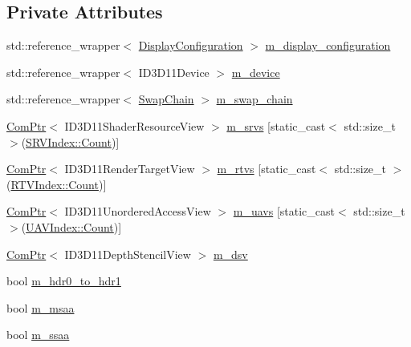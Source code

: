 \subsection*{Private Attributes}
\begin{DoxyCompactItemize}
\item 
std\+::reference\+\_\+wrapper$<$ \mbox{\hyperlink{classmage_1_1rendering_1_1_display_configuration}{Display\+Configuration}} $>$ \mbox{\hyperlink{classmage_1_1rendering_1_1_output_manager_a41905bc9eb0426c2e75d33d60bb95fbf}{m\+\_\+display\+\_\+configuration}}
\item 
std\+::reference\+\_\+wrapper$<$ I\+D3\+D11\+Device $>$ \mbox{\hyperlink{classmage_1_1rendering_1_1_output_manager_ad0f8b4613dfbd613576a3c58c8ff4c37}{m\+\_\+device}}
\item 
std\+::reference\+\_\+wrapper$<$ \mbox{\hyperlink{classmage_1_1rendering_1_1_swap_chain}{Swap\+Chain}} $>$ \mbox{\hyperlink{classmage_1_1rendering_1_1_output_manager_ac9cffc724a38ffd3d9b49475fd29d3ba}{m\+\_\+swap\+\_\+chain}}
\item 
\mbox{\hyperlink{namespacemage_ae74f374780900893caa5555d1031fd79}{Com\+Ptr}}$<$ I\+D3\+D11\+Shader\+Resource\+View $>$ \mbox{\hyperlink{classmage_1_1rendering_1_1_output_manager_afed4d1ad29f51cb2ad8aaa51b56c6f38}{m\+\_\+srvs}} \mbox{[}static\+\_\+cast$<$ std\+::size\+\_\+t $>$(\mbox{\hyperlink{classmage_1_1rendering_1_1_output_manager_a941f1b35a83ee0ce190494523ec0fe63ae93f994f01c537c4e2f7d8528c3eb5e9}{S\+R\+V\+Index\+::\+Count}})\mbox{]}
\item 
\mbox{\hyperlink{namespacemage_ae74f374780900893caa5555d1031fd79}{Com\+Ptr}}$<$ I\+D3\+D11\+Render\+Target\+View $>$ \mbox{\hyperlink{classmage_1_1rendering_1_1_output_manager_a311775ed4486b1bb107f2ac0eaebcc73}{m\+\_\+rtvs}} \mbox{[}static\+\_\+cast$<$ std\+::size\+\_\+t $>$(\mbox{\hyperlink{classmage_1_1rendering_1_1_output_manager_af9caebb7e9cacf454d26b827a01e857cae93f994f01c537c4e2f7d8528c3eb5e9}{R\+T\+V\+Index\+::\+Count}})\mbox{]}
\item 
\mbox{\hyperlink{namespacemage_ae74f374780900893caa5555d1031fd79}{Com\+Ptr}}$<$ I\+D3\+D11\+Unordered\+Access\+View $>$ \mbox{\hyperlink{classmage_1_1rendering_1_1_output_manager_a5c0ae88c300a1fe09f19d4cca3bef197}{m\+\_\+uavs}} \mbox{[}static\+\_\+cast$<$ std\+::size\+\_\+t $>$(\mbox{\hyperlink{classmage_1_1rendering_1_1_output_manager_a71b3797fef957312f92736f15b7ada3eae93f994f01c537c4e2f7d8528c3eb5e9}{U\+A\+V\+Index\+::\+Count}})\mbox{]}
\item 
\mbox{\hyperlink{namespacemage_ae74f374780900893caa5555d1031fd79}{Com\+Ptr}}$<$ I\+D3\+D11\+Depth\+Stencil\+View $>$ \mbox{\hyperlink{classmage_1_1rendering_1_1_output_manager_a48225f5d17db8e3d0e44adc2689d326f}{m\+\_\+dsv}}
\item 
bool \mbox{\hyperlink{classmage_1_1rendering_1_1_output_manager_aee20394757c9f7ebcaf7f8682747d716}{m\+\_\+hdr0\+\_\+to\+\_\+hdr1}}
\item 
bool \mbox{\hyperlink{classmage_1_1rendering_1_1_output_manager_a3affee412b093ea168b9e4a22c713421}{m\+\_\+msaa}}
\item 
bool \mbox{\hyperlink{classmage_1_1rendering_1_1_output_manager_ae0016fada4d4550d58481d2c313ea524}{m\+\_\+ssaa}}
\end{DoxyCompactItemize}


